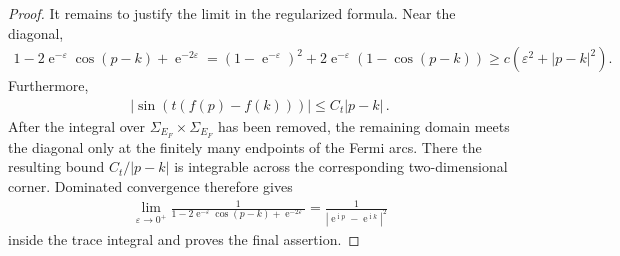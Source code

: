 \documentclass[10pt,a4paper]{amsart}
\newcommand{\ee}{\operatorname{e}}
\newcommand{\eq}[1]{\begin{align*}#1\end{align*}}
\newcommand{\ii}{\operatorname{i}}
\newcommand{\ve}{\varepsilon}
\begin{document}
\begin{proof}
It remains to justify the limit in the regularized formula. Near the
diagonal,
\eq{1-2\ee^{-\ve}\cos(p-k)+\ee^{-2\ve}
=
(1-\ee^{-\ve})^2
+2\ee^{-\ve}(1-\cos(p-k))
\geq c\left(\ve^2+|p-k|^2\right).}
Furthermore,
\eq{\left|\sin\left(t(f(p)-f(k))\right)\right|
\leq C_t|p-k|\,.}
After the integral over
$\Sigma_{E_F}\times\Sigma_{E_F}$ has been removed, the remaining domain
meets the diagonal only at the finitely many endpoints of the Fermi arcs.
There the resulting bound $C_t/|p-k|$ is integrable across the corresponding
two-dimensional corner. Dominated convergence therefore gives
\eq{\lim_{\ve\to0^+}
\frac{1}
{1-2\ee^{-\ve}\cos(p-k)+\ee^{-2\ve}}
=
\frac{1}{|\ee^{\ii p}-\ee^{\ii k}|^2}}
inside the trace integral and proves the final assertion.
\end{proof}
\end{document}
